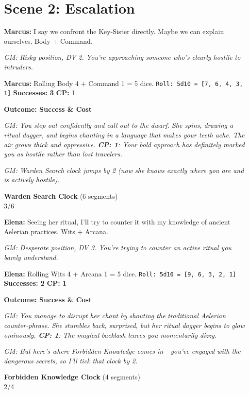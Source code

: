 \documentclass[11pt]{article}
\newcommand{\player}[1]{\textbf{#1:}}
\newcommand{\gm}[1]{\textit{GM: #1}}
\newcommand{\roll}[2]{\texttt{Roll: #1d10 = [#2]}}
\newcommand{\success}[1]{\textbf{Successes: #1}}
\newcommand{\cp}[1]{\textbf{CP: #1}}
\newcommand{\outcome}[1]{\textbf{Outcome: #1}}
\newcommand{\clocksegment}{\textbullet}
\begin{document}
\section*{Scene 2: Escalation}

\player{Marcus} I say we confront the Key-Sister directly. Maybe we can explain ourselves. Body + Command.

\gm{Risky position, DV 2. You're approaching someone who's clearly hostile to intruders.}

\player{Marcus} Rolling Body 4 + Command 1 = 5 dice. \roll{5}{7, 6, 4, 3, 1} \success{3} \cp{1}

\outcome{Success \& Cost}

\gm{You step out confidently and call out to the dwarf. She spins, drawing a ritual dagger, and begins chanting in a language that makes your teeth ache. The air grows thick and oppressive. \cp{1}: Your bold approach has definitely marked you as hostile rather than lost travelers.}

\gm{Warden Search clock jumps by 2 (now she knows exactly where you are and is actively hostile).}

\begin{center}
\textbf{Warden Search Clock} (6 segments)\\
\fbox{\textcolor{clockcolor}{\clocksegment\clocksegment\clocksegment}\clocksegment\clocksegment\clocksegment} 3/6
\end{center}

\player{Elena} Seeing her ritual, I'll try to counter it with my knowledge of ancient Aelerian practices. Wits + Arcana.

\gm{Desperate position, DV 3. You're trying to counter an active ritual you barely understand.}

\player{Elena} Rolling Wits 4 + Arcana 1 = 5 dice. \roll{5}{9, 6, 3, 2, 1} \success{2} \cp{1}

\outcome{Success \& Cost}

\gm{You manage to disrupt her chant by shouting the traditional Aelerian counter-phrase. She stumbles back, surprised, but her ritual dagger begins to glow ominously. \cp{1}: The magical backlash leaves you momentarily dizzy.}

\gm{But here's where Forbidden Knowledge comes in - you've engaged with the dangerous secrets, so I'll tick that clock by 2.}

\begin{center}
\textbf{Forbidden Knowledge Clock} (4 segments)\\
\fbox{\textcolor{clockcolor}{\clocksegment\clocksegment}\clocksegment\clocksegment} 2/4
\end{center}
\end{document}
